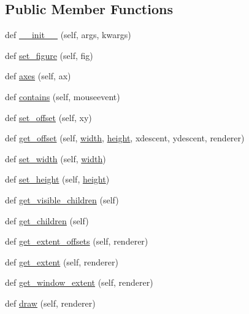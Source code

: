 \subsection*{Public Member Functions}
\begin{DoxyCompactItemize}
\item 
def \hyperlink{classmatplotlib_1_1offsetbox_1_1OffsetBox_a861c42317b3c5d68002e4da354bb5330}{\+\_\+\+\_\+init\+\_\+\+\_\+} (self, args, kwargs)
\item 
def \hyperlink{classmatplotlib_1_1offsetbox_1_1OffsetBox_a3a9ba49f31f280a884015ab7b3629e23}{set\+\_\+figure} (self, fig)
\item 
def \hyperlink{classmatplotlib_1_1offsetbox_1_1OffsetBox_a79e3ba52516a180b57a1349dd2db486f}{axes} (self, ax)
\item 
def \hyperlink{classmatplotlib_1_1offsetbox_1_1OffsetBox_a28fe165606bcae5360f7eaf73fc4b436}{contains} (self, mouseevent)
\item 
def \hyperlink{classmatplotlib_1_1offsetbox_1_1OffsetBox_a5fa83089553420e53c944acbd6e914fb}{set\+\_\+offset} (self, xy)
\item 
def \hyperlink{classmatplotlib_1_1offsetbox_1_1OffsetBox_a3fcbad2280a49099dfe34becb0826cad}{get\+\_\+offset} (self, \hyperlink{classmatplotlib_1_1offsetbox_1_1OffsetBox_abac1dd3129951024dc82dd89aaa73c71}{width}, \hyperlink{classmatplotlib_1_1offsetbox_1_1OffsetBox_a1e3aa392cb62c6c31bd004c42b1f1553}{height}, xdescent, ydescent, renderer)
\item 
def \hyperlink{classmatplotlib_1_1offsetbox_1_1OffsetBox_aafd5cfd10c61f7fb0c28e3ef6e36a0b8}{set\+\_\+width} (self, \hyperlink{classmatplotlib_1_1offsetbox_1_1OffsetBox_abac1dd3129951024dc82dd89aaa73c71}{width})
\item 
def \hyperlink{classmatplotlib_1_1offsetbox_1_1OffsetBox_ad01c06c9459ed3b1a1468b53db869014}{set\+\_\+height} (self, \hyperlink{classmatplotlib_1_1offsetbox_1_1OffsetBox_a1e3aa392cb62c6c31bd004c42b1f1553}{height})
\item 
def \hyperlink{classmatplotlib_1_1offsetbox_1_1OffsetBox_a55c93ea855074d38ad3c0dba9e1896c2}{get\+\_\+visible\+\_\+children} (self)
\item 
def \hyperlink{classmatplotlib_1_1offsetbox_1_1OffsetBox_a1534ae6ea6af5fec69f04e003e89704b}{get\+\_\+children} (self)
\item 
def \hyperlink{classmatplotlib_1_1offsetbox_1_1OffsetBox_ad633bbf15cc3edfdeae10490453f54af}{get\+\_\+extent\+\_\+offsets} (self, renderer)
\item 
def \hyperlink{classmatplotlib_1_1offsetbox_1_1OffsetBox_afbba594fd2219eb5d77be439de38c1eb}{get\+\_\+extent} (self, renderer)
\item 
def \hyperlink{classmatplotlib_1_1offsetbox_1_1OffsetBox_a1bebc3c91935b8958879d7d423f6ce5a}{get\+\_\+window\+\_\+extent} (self, renderer)
\item 
def \hyperlink{classmatplotlib_1_1offsetbox_1_1OffsetBox_a33d9e36393e193723db8a14436391526}{draw} (self, renderer)
\end{DoxyCompactItemize}
